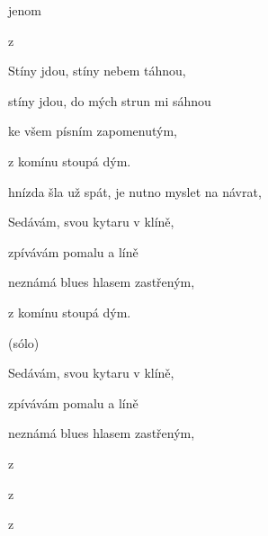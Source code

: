 

\zs
{}  

   

 jenom  

z    
\ks

\zs
Stíny jdou, stíny nebem táhnou,

stíny jdou, do mých strun mi sáhnou

ke všem písním zapomenutým,

z komínu stoupá dým.
\ks

\zr
{} hnízda šla už spát, je nutno myslet na návrat,

 

  

 
\kr

\zs
Sedávám, svou kytaru v klíně,

zpívávám pomalu a líně

neznámá blues hlasem zastřeným,

z komínu stoupá dým.
\ks

\zs
(sólo)
\ks

\zr
\kr

\zs
Sedávám, svou kytaru v klíně,

zpívávám pomalu a líně

neznámá blues hlasem zastřeným,

z    
 
z    
 
z   
\ks

\kp

